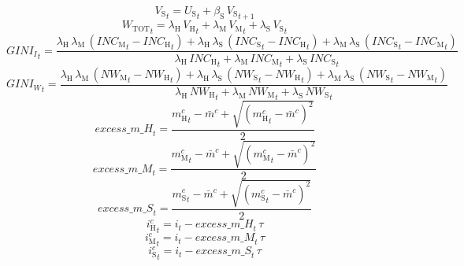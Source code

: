 \begin{dmath}
{V_\mathrm{S}}_{t}={U_\mathrm{S}}_{t}+{\beta_\mathrm{S}}\, {V_\mathrm{S}}_{t+1}
\end{dmath}
\begin{dmath}
{W_\mathrm{TOT}}_{t}={\lambda_\mathrm{H}}\, {V_\mathrm{H}}_{t}+{\lambda_\mathrm{M}}\, {V_\mathrm{M}}_{t}+{\lambda_\mathrm{S}}\, {V_\mathrm{S}}_{t}
\end{dmath}
\begin{dmath}
{GINI_I}_{t}=\frac{{\lambda_\mathrm{H}}\, {\lambda_\mathrm{M}}\, \left({INC_\mathrm{M}}_{t}-{INC_\mathrm{H}}_{t}\right)+{\lambda_\mathrm{H}}\, {\lambda_\mathrm{S}}\, \left({INC_\mathrm{S}}_{t}-{INC_\mathrm{H}}_{t}\right)+{\lambda_\mathrm{M}}\, {\lambda_\mathrm{S}}\, \left({INC_\mathrm{S}}_{t}-{INC_\mathrm{M}}_{t}\right)}{{\lambda_\mathrm{H}}\, {INC_\mathrm{H}}_{t}+{\lambda_\mathrm{M}}\, {INC_\mathrm{M}}_{t}+{\lambda_\mathrm{S}}\, {INC_\mathrm{S}}_{t}}
\end{dmath}
\begin{dmath}
{GINI_W}_{t}=\frac{{\lambda_\mathrm{H}}\, {\lambda_\mathrm{M}}\, \left({NW_\mathrm{M}}_{t}-{NW_\mathrm{H}}_{t}\right)+{\lambda_\mathrm{H}}\, {\lambda_\mathrm{S}}\, \left({NW_\mathrm{S}}_{t}-{NW_\mathrm{H}}_{t}\right)+{\lambda_\mathrm{M}}\, {\lambda_\mathrm{S}}\, \left({NW_\mathrm{S}}_{t}-{NW_\mathrm{M}}_{t}\right)}{{\lambda_\mathrm{H}}\, {NW_\mathrm{H}}_{t}+{\lambda_\mathrm{M}}\, {NW_\mathrm{M}}_{t}+{\lambda_\mathrm{S}}\, {NW_\mathrm{S}}_{t}}
\end{dmath}
\begin{dmath}
{excess\_m\_H}_{t}=\frac{{m^c_\mathrm{H}}_{t}-{\bar{m}^c}+\sqrt{\left({m^c_\mathrm{H}}_{t}-{\bar{m}^c}\right)^{2}}}{2}
\end{dmath}
\begin{dmath}
{excess\_m\_M}_{t}=\frac{{m^c_\mathrm{M}}_{t}-{\bar{m}^c}+\sqrt{\left({m^c_\mathrm{M}}_{t}-{\bar{m}^c}\right)^{2}}}{2}
\end{dmath}
\begin{dmath}
{excess\_m\_S}_{t}=\frac{{m^c_\mathrm{S}}_{t}-{\bar{m}^c}+\sqrt{\left({m^c_\mathrm{S}}_{t}-{\bar{m}^c}\right)^{2}}}{2}
\end{dmath}
\begin{dmath}
{i^c_\mathrm{H}}_{t}={i}_{t}-{excess\_m\_H}_{t}\, {\tau}
\end{dmath}
\begin{dmath}
{i^c_\mathrm{M}}_{t}={i}_{t}-{excess\_m\_M}_{t}\, {\tau}
\end{dmath}
\begin{dmath}
{i^c_\mathrm{S}}_{t}={i}_{t}-{excess\_m\_S}_{t}\, {\tau}
\end{dmath}
